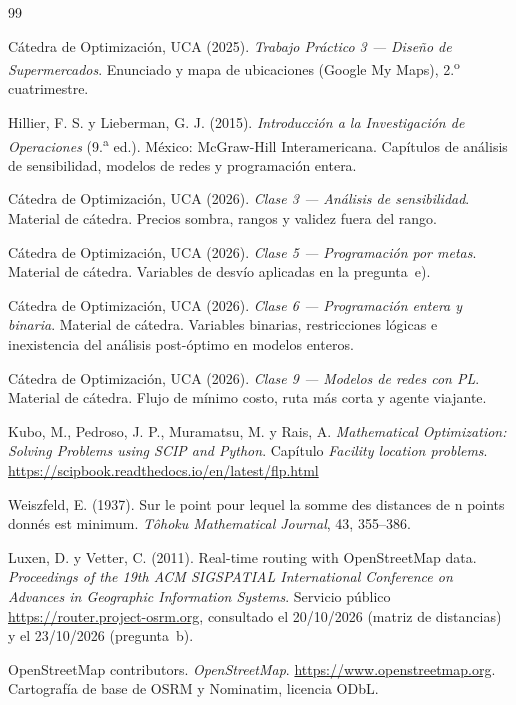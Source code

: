 \documentclass[10pt,a4paper]{article}
\begin{document}
\begin{thebibliography}{99}

 Cátedra de Optimización, UCA (2025).
  \emph{Trabajo Práctico 3 — Diseño de Supermercados}. Enunciado y mapa de
  ubicaciones (Google My Maps), 2.\textsuperscript{o} cuatrimestre.

 Hillier, F. S. y Lieberman, G. J. (2015).
  \emph{Introducción a la Investigación de Operaciones} (9.\textsuperscript{a}
  ed.). México: McGraw-Hill Interamericana. Capítulos de análisis de
  sensibilidad, modelos de redes y programación entera.

 Cátedra de Optimización, UCA (2026).
  \emph{Clase 3 — Análisis de sensibilidad}. Material de cátedra. Precios
  sombra, rangos y validez fuera del rango.

 Cátedra de Optimización, UCA (2026).
  \emph{Clase 5 — Programación por metas}. Material de cátedra. Variables de
  desvío aplicadas en la pregunta~e).

 Cátedra de Optimización, UCA (2026).
  \emph{Clase 6 — Programación entera y binaria}. Material de cátedra.
  Variables binarias, restricciones lógicas e inexistencia del análisis
  post-óptimo en modelos enteros.

 Cátedra de Optimización, UCA (2026).
  \emph{Clase 9 — Modelos de redes con PL}. Material de cátedra. Flujo de
  mínimo costo, ruta más corta y agente viajante.

 Kubo, M., Pedroso, J. P., Muramatsu, M. y Rais, A.
  \emph{Mathematical Optimization: Solving Problems using SCIP and Python}.
  Capítulo \emph{Facility location problems}.
  \url{https://scipbook.readthedocs.io/en/latest/flp.html}

 Weiszfeld, E. (1937). Sur le point pour lequel la somme
  des distances de n points donnés est minimum. \emph{Tôhoku Mathematical
  Journal}, 43, 355--386.

 Luxen, D. y Vetter, C. (2011). Real-time routing with
  OpenStreetMap data. \emph{Proceedings of the 19th ACM SIGSPATIAL
  International Conference on Advances in Geographic Information Systems}.
  Servicio público \url{https://router.project-osrm.org}, consultado el
  20/10/2026 (matriz de distancias) y el 23/10/2026 (pregunta~b).

 OpenStreetMap contributors. \emph{OpenStreetMap}.
  \url{https://www.openstreetmap.org}. Cartografía de base de OSRM y
  Nominatim, licencia ODbL.


\end{thebibliography}
\end{document}
